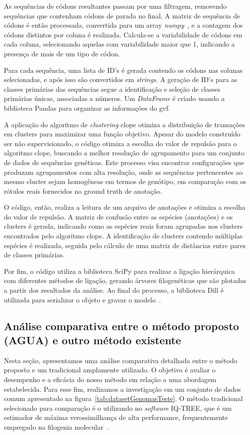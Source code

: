 As sequências de códons resultantes passam por uma filtragem, removendo sequências que contenham códons de parada no final. A matriz de sequência de códons é então processada, convertida para um array \textit{numpy}~\cite{numpy_van_2011}, e a contagem dos códons distintos por coluna é realizada. Calcula-se a variabilidade de códons em cada coluna, selecionando aquelas com variabilidade maior que 1, indicando a presença de mais de um tipo de códon.

Para cada sequência, uma lista de ID's é gerada contendo os códons nas colunas selecionadas, e após isso são convertidos em \textit{strings}. A geração de ID's para as classes primárias das sequências segue a identificação e seleção de classes primárias únicas, associadas a números. Um \textit{DataFrame} é criado usando a biblioteca Pandas para organizar as informações do \gls{gvf}.

A aplicação do algoritmo de \textit{clustering} clope otimiza a distribuição de transações em clusters para maximizar uma função objetivo\cite{clope_yang_2002}. Apesar do modelo construído ser não supervisionado, o código otimiza a escolha do valor de repulsão para o algoritmo clope, buscando a melhor resolução de agrupamento para um conjunto de dados de sequências genéticas. Este processo visa encontrar configurações que produzam agrupamentos com alta resolução, onde as sequências pertencentes ao mesmo cluster sejam homogêneas em termos de genótipo, em comparação com os rótulos reais fornecidos no ground truth de anotação.

O código, então, realiza a leitura de um arquivo de anotações e otimiza a escolha do valor de repulsão. A matriz de confusão entre as espécies (anotações) e os clusters é gerada, indicando como as espécies reais foram agrupadas nos clusters encontrados pelo algoritmo clope. A identificação de clusters contendo múltiplas espécies é realizada, seguida pelo cálculo de uma matriz de distâncias entre pares de classes primárias.

Por fim, o código utiliza a biblioteca SciPy para realizar a ligação hierárquica com diferentes métodos de ligação, gerando árvores filogenéticas que são plotadas a partir dos resultados da análise. Ao final do processo, a biblioteca Dill é utilizada para serializar o objeto e gravar o modelo~\cite{dill}.

\subsection{Análise comparativa entre o método proposto (AGUA) e outro método existente}
Nesta seção, apresentamos uma análise comparativa detalhada entre o método proposto e um tradicional amplamente utilizado. O objetivo é avaliar o desempenho e a eficácia do nosso método em relação a uma abordagem estabelecida. Para esse fim, realizamos a investigação em um conjunto de dados comum apresentado na figura~\ref{tab:datasetGenomasTeste}. O método tradicional selecionado para comparação é o utilizando no \textit{software} IQ-TREE, que é um estimador de máxima verossimilhança de alta performance, frequentemente empregado na filogenia molecular~\cite{iqtree2_minh_2020}.

